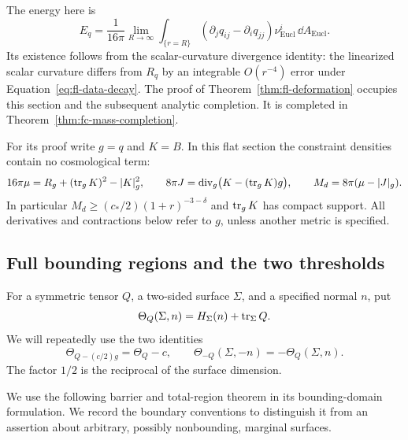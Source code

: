 The energy here is
\[
 E_q=\frac1{16\pi}\lim_{R\to\infty}
 \int_{\{r=R\}}
   (\partial_jq_{ij}-\partial_iq_{jj})\nu_{\mathrm{Eucl}}^i
   \,\dd A_{\mathrm{Eucl}} .
\]
Its existence follows from the scalar-curvature divergence identity:
the linearized scalar curvature differs from \(R_q\) by an integrable
\(O(r^{-4})\) error under Equation~\eqref{eq:fl-data-decay}.
The proof of Theorem~\ref{thm:fl-deformation} occupies this section and
the subsequent analytic completion.  It is completed in
Theorem~\ref{thm:fc-mass-completion}.

For its proof write \(g=q\) and \(K=B\).  In this flat section the
constraint densities contain no cosmological term:
\begin{equation}
\label{eq:fl-flat-constraints}
 16\pi\mu=R_g+(\operatorname{tr}_gK)^2-\lvert K\rvert_g^2,\qquad
 8\pi J=\operatorname{div}_g\bigl(K-(\operatorname{tr}_gK)g\bigr),\qquad
 M_d=8\pi(\mu-\lvert J\rvert_g).
\end{equation}
In particular \(M_d\ge(c_*/2)(1+r)^{-3-\delta}\) and
\(\operatorname{tr}_gK\) has compact support.  All derivatives and contractions below
refer to \(g\), unless another metric is specified.

\subsection{Full bounding regions and the two thresholds}
\label{subsec:fl-regions}

For a symmetric tensor \(Q\), a two-sided surface \(\Sigma\), and a
specified normal \(n\), put
\[
 \Theta_Q(\Sigma,n)=H_\Sigma(n)+\operatorname{tr}_\Sigma Q.
\]
We will repeatedly use the two identities
\begin{equation}
\label{eq:fl-expansion-signs}
 \Theta_{Q-(c/2)g}=\Theta_Q-c,\qquad
 \Theta_{-Q}(\Sigma,-n)=-\Theta_Q(\Sigma,n).
\end{equation}
The factor \(1/2\) is the reciprocal of the surface dimension.

We use the following barrier and total-region theorem in its
bounding-domain formulation.
We record the boundary conventions to distinguish it from an assertion
about arbitrary, possibly nonbounding, marginal surfaces.

